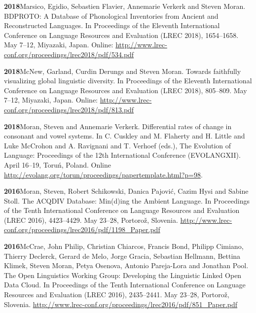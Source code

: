 \documentclass[11pt]{article}
\newcommand{\hangpara}{
 \setlength{\parindent}{0in} %
 \hangindent=0.42in %
}
\begin{document}
\vskip 6pt
\hangpara
{\bf 2018}\hspace{1ex}Marsico, Egidio, Sebastien Flavier, Annemarie Verkerk and Steven Moran. BDPROTO: A Database of Phonological Inventories from Ancient and Reconstructed Languages. In Proceedings of the Eleventh International Conference on Language Resources and Evaluation (LREC 2018), 1654--1658. May 7--12, Miyazaki, Japan. Online: \url{http://www.lrec-conf.org/proceedings/lrec2018/pdf/534.pdf}

\vskip 6pt
\hangpara
{\bf 2018}\hspace{1ex}McNew, Garland, Curdin Derungs and Steven Moran. Towards faithfully visualizing global linguistic diversity. In Proceedings of the Eleventh International Conference on Language Resources and Evaluation (LREC 2018), 805--809. May 7--12, Miyazaki, Japan. Online: \url{http://www.lrec-conf.org/proceedings/lrec2018/pdf/813.pdf}

\vskip 6pt
\hangpara
{\bf 2018}\hspace{1ex}Moran, Steven and Annemarie Verkerk. Differential rates of change in consonant and vowel systems. In C. Cuskley and M. Flaherty and H. Little and Luke McCrohon and A. Ravignani and T. Verhoef (eds.), The Evolution of Language: Proceedings of the 12th International Conference (EVOLANGXII). April 16--19, Toru{\'n}, Poland. Online \url{http://evolang.org/torun/proceedings/papertemplate.html?p=98}. %

\vskip 6pt
\hangpara
{\bf 2016}\hspace{1ex}Moran, Steven, Robert Schikowski, Danica Pajovi{\'c}, Cazim Hysi and Sabine Stoll. The ACQDIV Database: Min(d)ing the Ambient Language. In Proceedings of the Tenth International Conference on Language Resources and Evaluation (LREC 2016), 4423--4429. May 23--28, Portoro{\v z}, Slovenia. \url{http://www.lrec-conf.org/proceedings/lrec2016/pdf/1198\_Paper.pdf}

\vskip 6pt
\hangpara
{\bf 2016}\hspace{1ex}McCrae, John Philip, Christian Chiarcos, Francis Bond, Philipp Cimiano, Thierry Declerck, Gerard de Melo, Jorge Gracia, Sebastian Hellmann, Bettina Klimek, Steven Moran, Petya Osenova, Antonio Pareja-Lora and Jonathan Pool. The Open Linguistics Working Group: Developing the Linguistic Linked Open Data Cloud. In Proceedings of the Tenth International Conference on Language Resources and Evaluation (LREC 2016), 2435--2441. May 23--28, Portoro{\v z}, Slovenia. \url{http://www.lrec-conf.org/proceedings/lrec2016/pdf/851\_Paper.pdf}
\end{document}
